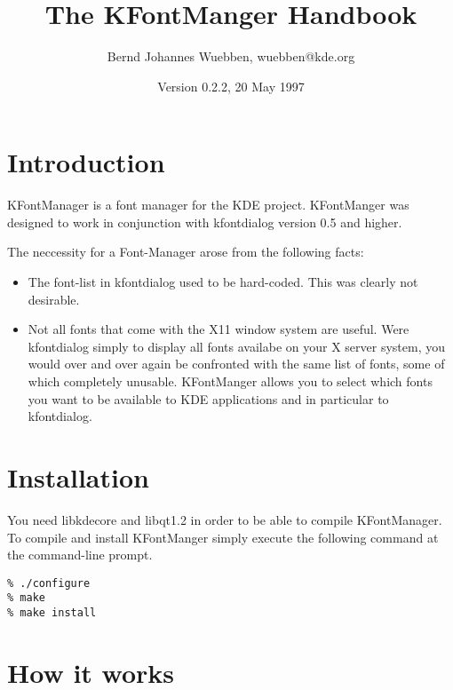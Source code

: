 \documentclass{article}
\title{The KFontManger Handbook}
\author{Bernd Johannes Wuebben, {\ttfamily wuebben@kde.org}}
\date{Version 0.2.2, 20 May 1997}
\begin{document}
\maketitle
\tableofcontents

\section{Introduction}



KFontManager is a font manager for the KDE project. KFontManger was designed
to work in conjunction with kfontdialog version 0.5 and higher.

The neccessity for a Font-Manager arose from the following facts:

\begin{itemize}
\item The font-list in kfontdialog used to be hard-coded. This was clearly
not desirable. 
\item Not all fonts that come with the X11 window system are useful. Were
kfontdialog simply to display all fonts availabe on your X server system,
you would over and over again be confronted with the same list of fonts,
some of which completely unusable. KFontManger allows you to select which
fonts you want to be available to KDE applications and in particular to
kfontdialog.
\end{itemize}





\section{Installation}



You need libkdecore and libqt1.2 in order to be able to compile KFontManager.
To compile and install KFontManger simply execute the following command
at the command-line prompt.

\begin{tscreen}
\begin{verbatim}
% ./configure
% make
% make install
\end{verbatim}
\end{tscreen}







\section{How it works}
\end{document}
